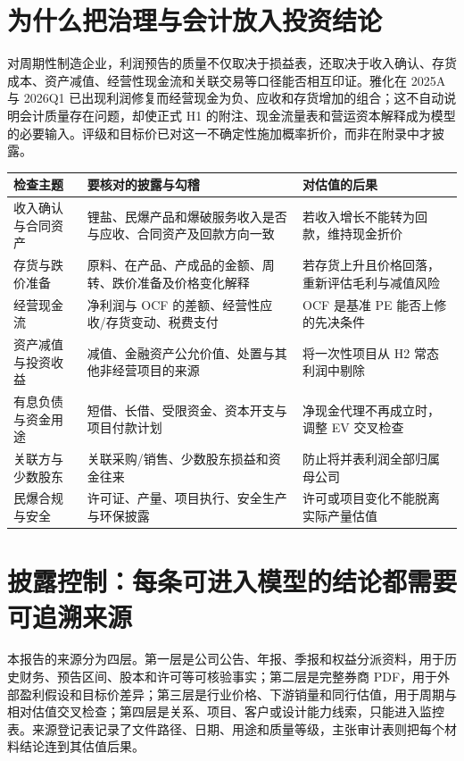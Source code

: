 \section{为什么把治理与会计放入投资结论}

对周期性制造企业，利润预告的质量不仅取决于损益表，还取决于收入确认、存货成本、资产减值、经营性现金流和关联交易等口径能否相互印证。雅化在 2025A 与 2026Q1 已出现利润修复而经营现金为负、应收和存货增加的组合；这不自动说明会计质量存在问题，却使正式 H1 的附注、现金流量表和营运资本解释成为模型的必要输入。评级和目标价已对这一不确定性施加概率折价，而非在附录中才披露。

\begin{exhibitbox}[表 A-9：正式 H1 的会计与治理检查清单]
\begin{tabularx}{\exhibitboxwidth}{L{2.9cm}X X}
\toprule
检查主题 & 要核对的披露与勾稽 & 对估值的后果 \\
\midrule
收入确认与合同资产 & 锂盐、民爆产品和爆破服务收入是否与应收、合同资产及回款方向一致 & 若收入增长不能转为回款，维持现金折价 \\
存货与跌价准备 & 原料、在产品、产成品的金额、周转、跌价准备及价格变化解释 & 若存货上升且价格回落，重新评估毛利与减值风险 \\
经营现金流 & 净利润与 OCF 的差额、经营性应收/存货变动、税费支付 & OCF 是基准 PE 能否上修的先决条件 \\
资产减值与投资收益 & 减值、金融资产公允价值、处置与其他非经营项目的来源 & 将一次性项目从 H2 常态利润中剔除 \\
有息负债与资金用途 & 短借、长借、受限资金、资本开支与项目付款计划 & 净现金代理不再成立时，调整 EV 交叉检查 \\
关联方与少数股东 & 关联采购/销售、少数股东损益和资金往来 & 防止将并表利润全部归属母公司 \\
民爆合规与安全 & 许可证、产量、项目执行、安全生产与环保披露 & 许可或项目变化不能脱离实际产量估值 \\
\bottomrule
\end{tabularx}
\end{exhibitbox}

\section{披露控制：每条可进入模型的结论都需要可追溯来源}

本报告的来源分为四层。第一层是公司公告、年报、季报和权益分派资料，用于历史财务、预告区间、股本和许可等可核验事实；第二层是完整券商 PDF，用于外部盈利假设和目标价差异；第三层是行业价格、下游销量和同行估值，用于周期与相对估值交叉检查；第四层是关系、项目、客户或设计能力线索，只能进入监控表。来源登记表记录了文件路径、日期、用途和质量等级，主张审计表则把每个材料结论连到其估值后果。

